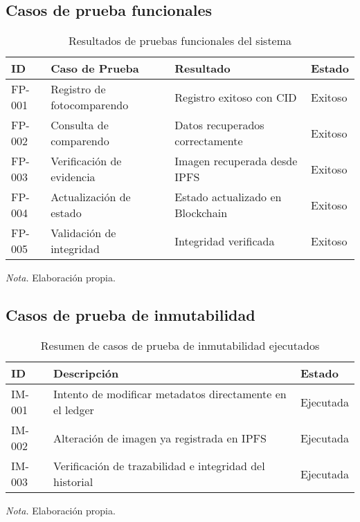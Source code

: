 
\subsection{Casos de prueba funcionales}

\begin{table}[htbp]
    \centering
    \caption{Resultados de pruebas funcionales del sistema}
    \begin{tabular}{p{2cm} p{4cm} p{3cm} p{3cm}}
        \toprule
        \textbf{ID} & \textbf{Caso de Prueba} & \textbf{Resultado} & \textbf{Estado} \\
        \midrule
        FP-001 & Registro de fotocomparendo & Registro exitoso con CID & Exitoso \\
        FP-002 & Consulta de comparendo & Datos recuperados correctamente & Exitoso \\
        FP-003 & Verificación de evidencia & Imagen recuperada desde IPFS & Exitoso \\
        FP-004 & Actualización de estado & Estado actualizado en Blockchain & Exitoso \\
        FP-005 & Validación de integridad & Integridad verificada & Exitoso \\
        \bottomrule
    \end{tabular}
    \vspace{2em}
    \begin{flushleft}
        \textit{Nota.} Elaboración propia.
    \end{flushleft}
    \label{tab:resultados_funcionales}
\end{table}

\subsection{Casos de prueba de inmutabilidad}

\begin{table}[htbp]
    \centering
    \caption{Resumen de casos de prueba de inmutabilidad ejecutados}
    \begin{tabular}{p{2cm} p{6cm} p{3cm}}
        \toprule
        \textbf{ID} & \textbf{Descripción} & \textbf{Estado} \\
        \midrule
        IM-001 & Intento de modificar metadatos directamente en el ledger & Ejecutada \\
        IM-002 & Alteración de imagen ya registrada en IPFS & Ejecutada \\
        IM-003 & Verificación de trazabilidad e integridad del historial & Ejecutada \\
        \bottomrule
    \end{tabular}
    \vspace{2em}
    \begin{flushleft}
        \textit{Nota.} Elaboración propia.
    \end{flushleft}
    \label{tab:resumen_inmutabilidad}
\end{table}

